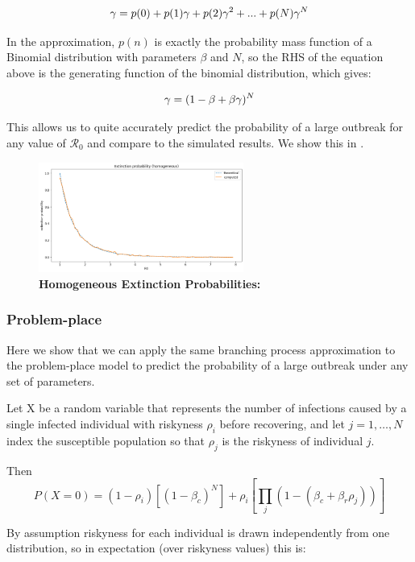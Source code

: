 \documentclass{article}
\begin{document}
$$
\gamma = p(0) + p(1) \gamma + p(2) \gamma^2 + ... + p(N) \gamma^N\\
$${

In the approximation, $p(n)$ is exactly the probability mass function
of a Binomial distribution with parameters $\beta$ and $N$, so the RHS of
the equation above is the generating function of the binomial distribution,
which gives:

$$
\gamma = (1 - \beta + \beta \gamma)^N\\
$$



This allows us to quite accurately predict the probability of a large outbreak
for any value of $\mathcal{R}_0$ and compare to the simulated results.
We show this in .

\begin{figure}
\centering
\includegraphics[width=0.6\textwidth]{extinction_homogeneous}
\caption{\textbf{Homogeneous Extinction Probabilities:} } 
\label{fig:extinction_homogeneous}
\end{figure}


\subsubsection{Problem-place}

Here we show that we can apply the same branching process approximation
to the problem-place model to predict the probability of a large outbreak
under any set of parameters.

Let X be a random variable that represents the number of infections caused by
a single infected individual with riskyness $\rho_i$ before recovering, and
let $j = 1, \ldots, N$ index the susceptible population so that $\rho_j$ is the
riskyness of individual $j$.

Then 
$$P(X = 0) = (1 - \rho_i) [ (1 - \beta_c)^N ] + \rho_i [ \prod_j (1 - (\beta_c + \beta_r \rho_j)) ]$$

By assumption riskyness for each individual is drawn independently from one
distribution, so in expectation (over riskyness values) this is:


}
\end{document}
